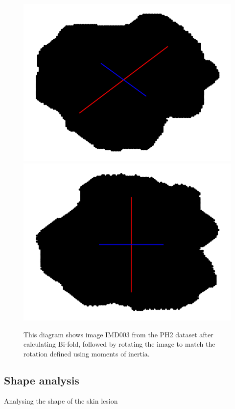 \begin{figure}
    \centering
    \includegraphics[scale=0.5]{images/asymmetry/bi-fold1.png}
    \includegraphics[scale=0.5]{images/asymmetry/bi-fold1-rotated.png}
    \caption{This diagram shows image IMD003 from the PH2 dataset after calculating Bi-fold, followed by rotating the image to match the rotation defined using moments of inertia.} 
\end{figure}\label{asy-bifold}

\subsection{Shape analysis}
Analysing the shape of the skin lesion 

